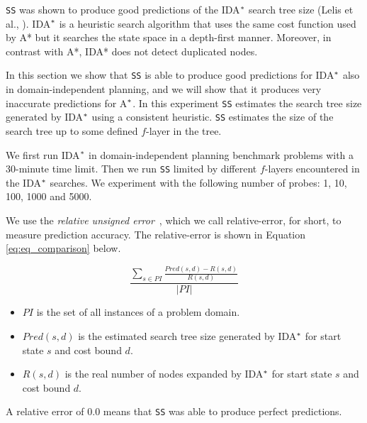 \noindent
\texttt{SS} was shown to produce good predictions of the IDA$\sp{*}$ search tree size (Lelis et al., \citeyear{lelis2013predicting}). IDA$\sp{*}$ is a heuristic search algorithm that uses the same cost function used by A* but it searches the state space in a depth-first manner. Moreover, in contrast with A*, IDA* does not detect duplicated nodes.

 
In this section we show that \texttt{SS} is able to produce good predictions for IDA$\sp{*}$ also in domain-independent planning, and we will show that it produces very inaccurate predictions for A$\sp{*}$. In this experiment \texttt{SS} estimates the search tree size generated by IDA$\sp{*}$ using a consistent heuristic. \texttt{SS} estimates the size of the search tree up to some defined $f$-layer in the tree.

We first run IDA$\sp{*}$ in domain-independent planning benchmark problems with a 30-minute time limit. Then we run \texttt{SS} limited by different $f$-layers encountered in the IDA$\sp{*}$ searches. We experiment with the following number of probes: 1, 10, 100, 1000 and 5000.

We use the \textit{relative unsigned error}~\cite{lelis2012fast}, which we call relative-error, for short, to measure prediction accuracy. The relative-error is shown in Equation \ref{eq:eq_comparison} below.

\begin{equation}
\frac{\sum_{s\in PI} \frac{Pred(s, d) - R(s, d)}{R(s, d)}}{|PI|}
\label{eq:eq_comparison}
\end{equation}

\begin{itemize}
  \item $PI$ is the set of all instances of a problem domain.
  \item $Pred(s,d)$ is the estimated search tree size generated by IDA$\sp{*}$ for start state $s$ and cost bound $d$.
  \item $R(s,d)$ is the real number of nodes expanded by IDA$\sp{*}$ for start state $s$ and cost bound $d$.
\end{itemize}
A relative error of 0.0 means that \texttt{SS} was able to produce perfect predictions.

